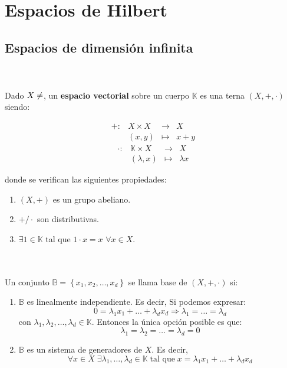 \chapter{Espacios de Hilbert}

\section{Espacios de dimensión infinita}

\begin{def.}\;\\\\
    Dado $X\neq \empty$, un \textbf{espacio vectorial} sobre un cuerpo $\mathbb{K}$ es una terna $(X,+,\cdot)$ siendo:
    \begin{multicols}{2}
    $$
    \begin{array}{rrcl}
	+:&X\times X&\to&X\\
	  &(x,y)&\mapsto&x+y
    \end{array}
    $$
    $$
    \begin{array}{rrcl}
	\cdot:&\mathbb{K}\times X&\to&X\\
	  &(\lambda,x)&\mapsto&\lambda x
    \end{array}
    $$
    \end{multicols}

    donde se verifican las siguientes propiedades:
    \begin{enumerate}
	    \item $(X,+)$ es un grupo abeliano.
	    \item $+/\cdot$ son distributivas.
	    \item $\exists 1\in \mathbb{K}$ tal que $1\cdot x=x$ $\forall x\in X$.
    \end{enumerate}
\end{def.}


\begin{def.}\;\\\\
    Un conjunto $\mathbb{B}=\left\{x_1,x_2,\ldots,x_d\right\}$ se llama base de $(X,+,\cdot)$ si:
	\begin{enumerate}
	    \item $\mathbb{B}$ es linealmente independiente. Es decir,
		Si podemos expresar:
		$$0=\lambda_1x_1+\ldots+\lambda_dx_d\Rightarrow \lambda_1=\ldots=\lambda_d$$
		con $\lambda_1,\lambda_2,\ldots,\lambda_d\in \mathbb{K}$. Entonces la única opción posible es que:
		$$\lambda_1=\lambda_2=\ldots=\lambda_d=0$$
	    \item $\mathbb{B}$ es un sistema de generadores de $X$. Es decir,
		$$\forall x\in X\;\exists \lambda_1,\ldots,\lambda_d\in \mathbb{K}\;\text{tal que}\; x=\lambda_1x_1+\ldots+\lambda_dx_d$$
	\end{enumerate}
\end{def.}

